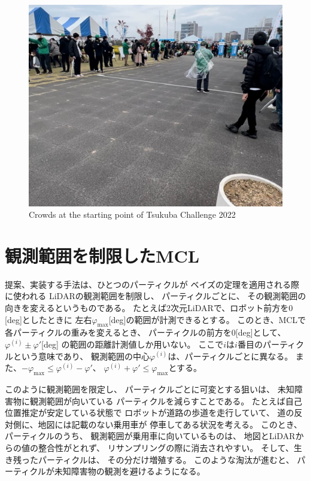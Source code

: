 \documentclass{jarticle}
\begin{document}
\begin{figure}[bth]
  \centering
	\includegraphics[width=0.8\linewidth]{fig/hitogomi.png}
   \caption{Crowds at the starting point of Tsukuba Challenge 2022}
   \label{fig:つくばチャレンジ人混み}
 \end{figure}

\section{観測範囲を制限したMCL}%

提案、実装する手法は、ひとつのパーティクルが
ベイズの定理を適用される際に使われる
LiDARの観測範囲を制限し、
パーティクルごとに、
その観測範囲の向きを変えるというものである。
たとえば2次元LiDARで、ロボット前方を$0$[deg]としたときに
左右$\varphi_\text{max}$[deg]の範囲が計測できるとする。
このとき、MCLで各パーティクルの重みを変えるとき、
パーティクルの前方を$0$[deg]として、
$\varphi^{(i)} \pm \varphi'$[deg]
の範囲の距離計測値しか用いない。
ここで$i$は$i$番目のパーティクルという意味であり、
観測範囲の中心$\varphi^{(i)}$は、パーティクルごとに異なる。
また、$ -\varphi_\text{max} \le \varphi^{(i)}-\varphi'$、
$\varphi^{(i)}+\varphi' \le \varphi_\text{max}$とする。

このように観測範囲を限定し、
パーティクルごとに可変とする狙いは、
未知障害物に観測範囲が向いている
パーティクルを減らすことである。
たとえば自己位置推定が安定している状態で
ロボットが道路の歩道を走行していて、
道の反対側に、地図には記載のない乗用車が
停車してある状況を考える。
このとき、パーティクルのうち、
観測範囲が乗用車に向いているものは、
地図とLiDARからの値の整合性がとれず、
リサンプリングの際に消去されやすい。
そして、生き残ったパーティクルは、
その分だけ増殖する。
このような淘汰が進むと、
パーティクルが未知障害物の観測を避けるようになる。
\end{document}

